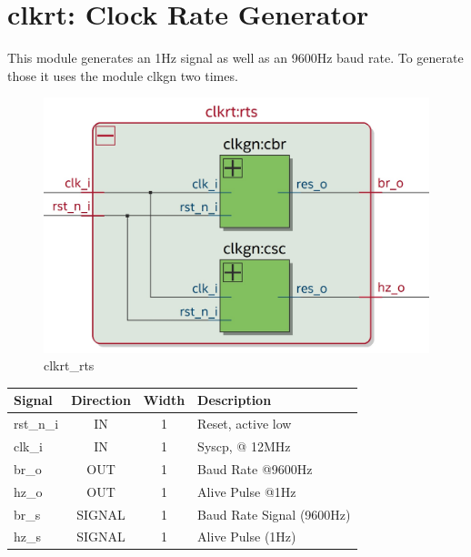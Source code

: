 \documentclass[12pt,a4 paper] {report}
\begin{document}
\section{clkrt: Clock Rate Generator}
This module generates an 1Hz signal as well as an 9600Hz baud rate. To generate those it uses the module clkgn two 
times.
\begin{figure}[h]
	\centering
	\includegraphics[scale=0.15]{../png/clkrt_rts.png}
	\caption{clkrt\_rts}
\end{figure}
\begin{center}
	\begin{tabular}{ | p{2cm} | c | c | p{5cm} |}
		\hline
		\textbf{Signal} & \textbf{Direction} & \textbf{Width} & \textbf{Description} \\
		\hline
		\hline
		rst\_n\_i & IN & 1 & Reset, active low \\
		\hline
		clk\_i & IN & 1 & Syscp, @ 12MHz \\
		\hline
		br\_o & OUT & 1 & Baud Rate @9600Hz \\
		\hline
		hz\_o & OUT & 1 & Alive Pulse @1Hz \\
		\hline
		\hline
		br\_s & SIGNAL & 1 & Baud Rate Signal (9600Hz) \\
		\hline	
		hz\_s & SIGNAL & 1 & Alive Pulse (1Hz) \\
		\hline	
	\end{tabular}
\end{center}

\newpage
\end{document}
